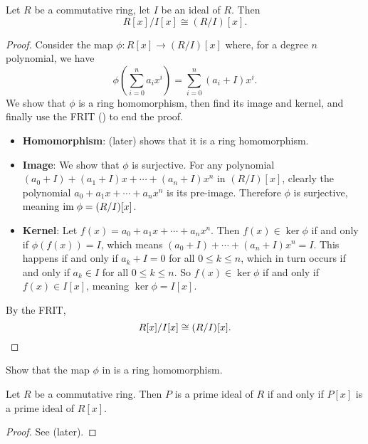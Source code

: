 \begin{proposition}\label{prop-polynomial-ring-quotient-ideal-polynomial-ring-cong-quotient-polynomial-ring}
    Let $R$ be a commutative ring, let $I$ be an ideal of $R$. Then
    \[
        R[x]/I[x] \cong (R/I)[x].
    \]
\end{proposition}
\begin{proof}
    Consider the map $\phi: R[x] \to (R/I)[x]$ where, for a degree $n$ polynomial, we have
    \[
        \phi\left(\sum_{i=0}^na_ix^i\right) = \sum_{i=0}^n (a_i+I)x^i.
    \]
    We show that $\phi$ is a ring homomorphism, then find its image and kernel, and finally use the FRIT () to end the proof.
    \begin{itemize}
        \item \textbf{Homomorphism}:  (later) shows that it is a ring homomorphism.
        
        \item \textbf{Image}: We show that $\phi$ is surjective. For any polynomial $(a_0+I) + (a_1+I)x + \cdots + (a_n+I)x^n$ in $(R/I)[x]$, clearly the polynomial $a_0 + a_1x + \cdots + a_nx^n$ is its pre-image. Therefore $\phi$ is surjective, meaning $\mathrm{im}\; \phi = (R/I)[x]$.
        
        \item \textbf{Kernel}: Let $f(x) = a_0 + a_1x + \cdots + a_nx^n$. Then $f(x) \in \ker\phi$ if and only if $\phi(f(x)) = I$, which means $(a_0+I) + \cdots + (a_n+I)x^n = I$. This happens if and only if $a_k + I = 0$ for all $0 \leq k \leq n$, which in turn occurs if and only if $a_k \in I$ for all $0 \leq k \leq n$. So $f(x) \in \ker\phi$ if and only if $f(x) \in I[x]$, meaning $\ker\phi = I[x]$.
    \end{itemize}
    By the FRIT,
    \[
        R[x]/I[x] \cong (R/I)[x].\qedhere
    \]
\end{proof}

\begin{exercise}\label{exercise-polynomial-ring-maps-to-quotient-polynomial-ring-is-homomorphism}
    Show that the map $\phi$ in  is a ring homomorphism.
\end{exercise}

\begin{theorem}\label{thrm-prime-ideal-iff-prime-ideal-in-polynomial-ring}
    Let $R$ be a commutative ring. Then $P$ is a prime ideal of $R$ if and only if $P[x]$ is a prime ideal of $R[x]$.
\end{theorem}
\begin{proof}
    See  (later).
\end{proof}

